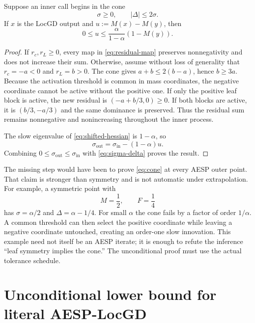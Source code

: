 \documentclass[11pt]{article}
\begin{document}
\begin{lemma}
\label{lem:conditional-innovation}
Suppose an inner call begins in the cone
\begin{equation}
  \sigma\geq0,
  \qquad
  |\Delta|\leq2\sigma.
  \label{eq:cone}
\end{equation}
If $x$ is the LocGD output and $u:=M(x)-M(y)$, then
\begin{equation}
  0\leq u
  \leq\frac{\alpha}{1-\alpha}(1-M(y)).
  \label{eq:cone-innovation}
\end{equation}
\end{lemma}

\begin{proof}
If $r_c,r_L\geq0$, every map in \cref{eq:residual-map} preserves
nonnegativity and does not increase their sum.  Otherwise, assume without
loss of generality that $r_c=-a<0$ and $r_L=b>0$.  The cone gives
$a+b\leq2(b-a)$, hence $b\geq3a$.  Because the activation threshold is common
in mass coordinates, the negative coordinate cannot be active without the
positive one.  If only the positive leaf block is active, the new residual is
$(-a+b/3,0)\geq0$.  If both blocks are active, it is
$(b/3,-a/3)$ and the same dominance is preserved.  Thus the residual sum
remains nonnegative and nonincreasing throughout the inner process.

The slow eigenvalue of \cref{eq:shifted-hessian} is $1-\alpha$, so
\[
  \sigma_{\mathrm{out}}
  =\sigma_{\mathrm{in}}-(1-\alpha)u.
\]
Combining $0\leq\sigma_{\mathrm{out}}\leq\sigma_{\mathrm{in}}$ with
\cref{eq:sigma-delta} proves the result.
\end{proof}

The missing step would have been to prove \cref{eq:cone} at every AESP outer
point.  That claim is stronger than symmetry and is not automatic under
extrapolation.  For example, a symmetric point with
\[
  M=\frac12,
  \qquad
  F=\frac14
\]
has $\sigma=\alpha/2$ and $\Delta=\alpha-1/4$.  For small $\alpha$ the cone
fails by a factor of order $1/\alpha$.  A common threshold can then select the
positive coordinate while leaving a negative coordinate untouched, creating
an order-one slow innovation.  This example need not itself be an AESP
iterate; it is enough to refute the inference ``leaf symmetry implies the
cone.''  The unconditional proof must use the actual tolerance schedule.

\section{Unconditional lower bound for literal AESP-LocGD}
\label{sec:main-proof}
\end{document}
